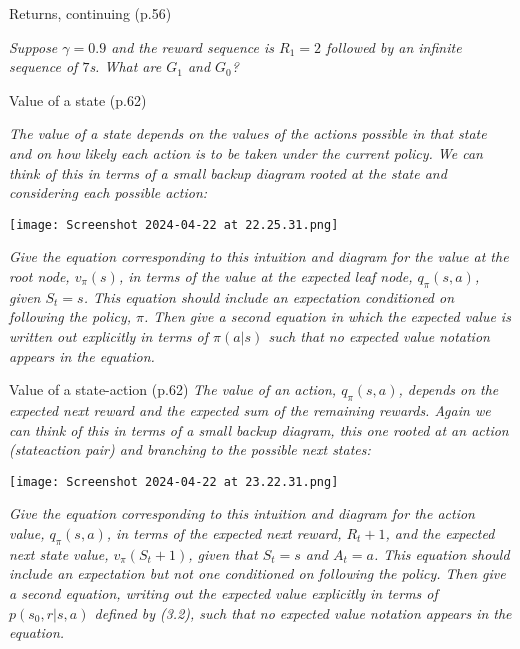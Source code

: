 \documentclass[12pt,letterpaper]{exam}
\begin{document}
\begin{questions}
	\setcounter{question}{9-1}%
	\question%
	Returns, continuing (p.56)

	\emph{Suppose \(\gamma=0.9\) and the reward sequence is \(R_1 = 2\) followed by an infinite sequence of \(7\)s. 
	What are \(G_1\) and \(G_0\)?}
	\begin{solution}
	\end{solution}

	\setcounter{question}{18-1}%
	\question%
	Value of a state (p.62)

	\emph{The value of a state depends on the values of the actions possible in that 
	state and on how likely each action is to be taken under the current policy. 
	We can think of this in terms of a small backup diagram rooted at the state and considering each possible action:}

	\texttt{[image: Screenshot 2024-04-22 at 22.25.31.png]}%

	\emph{Give the equation corresponding to this intuition and diagram for the value at the root node, \(v_\pi(s)\), 
	in terms of the value at the expected leaf node, \(q_\pi(s, a)\), given \(S_t = s\).
	This equation should include an expectation conditioned on following the policy, \(\pi\). 
	Then give a second equation in which the expected value is written out explicitly in terms of \(\pi(a|s)\) 
	such that no expected value notation appears in the equation.}
	\begin{solution}
	\end{solution}

	\question%
	Value of a state-action (p.62)
	\emph{The value of an action, \(q_\pi(s, a)\), depends on the expected next reward and the expected sum of the remaining rewards. 
	Again we can think of this in terms of a small backup diagram, this one rooted at an action (state\-action pair) 
	and branching to the possible next states:}
	
	\texttt{[image: Screenshot 2024-04-22 at 23.22.31.png]}%

	\emph{Give the equation corresponding to this intuition and diagram for the action value, \(q_\pi(s, a)\), 
	in terms of the expected next reward, \(R_t+1\), and the expected next state value, \(v_\pi(S_t+1)\), 
	given that \(S_t = s\) and \(A_t = a\). This equation should include an expectation but not one conditioned on following the policy. 
	Then give a second equation, writing out the expected value explicitly in terms of \(p(s_0,r|s, a)\) defined by (3.2), 
	such that no expected value notation appears in the equation.}
	\begin{solution}
	\end{solution}


\end{questions}
\end{document}
